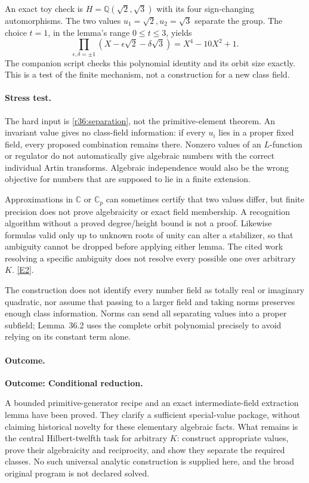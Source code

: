 \documentclass[11pt,a4paper]{article}
\newcommand{\Q}{\mathbb{Q}}
\newcommand{\C}{\mathbb{C}}
\newcommand{\eref}[2]{\hyperlink{extra:#1:#2}{[E#2]}}
\numberwithin{equation}{section}
\begin{document}
An exact toy check is $H=\Q(\sqrt2,\sqrt3)$ with its four sign-changing
automorphisms. The two values $u_1=\sqrt2,u_2=\sqrt3$ separate the group.
The choice $t=1$, in the lemma's range $0\le t\le3$, yields
\[
 \prod_{\epsilon,\delta=\pm1}
 (X-\epsilon\sqrt2-\delta\sqrt3)=X^4-10X^2+1.
\]
The companion script checks this polynomial identity and its orbit size
exactly. This is a test of the finite mechanism, not a construction for a
new class field.

\paragraph{Stress test.}
The hard input is \eqref{r36:separation}, not the primitive-element theorem.
An invariant value gives no class-field information: if every $u_i$ lies in
a proper fixed field, every proposed combination remains there. Nonzero
values of an $L$-function or regulator do not automatically give algebraic
numbers with the correct individual Artin transforms. Algebraic independence
would also be the wrong objective for numbers that are supposed to lie in a
finite extension.

Approximations in $\C$ or $\C_p$ can sometimes certify that two values differ,
but finite precision does not prove algebraicity or exact field membership.
A recognition algorithm without a proved degree/height bound is not a proof.
Likewise formulas valid only up to unknown roots of unity can alter a
stabilizer, so that ambiguity cannot be dropped before applying either lemma.
The cited work resolving a specific ambiguity does not resolve every possible
one over arbitrary $K$. \eref{45}{2}.

The construction does not identify every number field as totally real or
imaginary quadratic, nor assume that passing to a larger field and taking
norms preserves enough class information. Norms can send all separating
values into a proper subfield; Lemma~36.2 uses the complete orbit polynomial
precisely to avoid relying on its constant term alone.

\paragraph{Outcome.}
\textbf{Outcome: Conditional reduction.}

A bounded primitive-generator recipe and an exact intermediate-field extraction
lemma have been proved. They clarify a sufficient special-value package,
without claiming historical novelty for these elementary algebraic facts.
What remains is the central Hilbert-twelfth task for arbitrary $K$: construct
appropriate values, prove their algebraicity and reciprocity, and show they
separate the required classes. No such universal analytic construction is
supplied here, and the broad original program is not declared solved.
\end{document}
